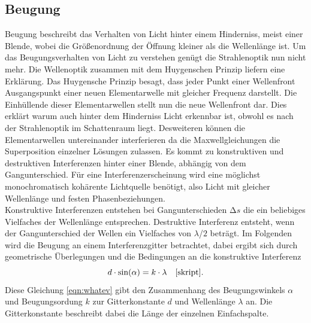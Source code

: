 \subsection{Beugung}
Beugung beschreibt das Verhalten von Licht hinter einem Hinderniss, meist einer Blende, wobei die Größenordnung der Öffnung kleiner als die Wellenlänge ist.
Um das Beugungsverhalten von Licht zu verstehen genügt die Strahlenoptik nun nicht mehr. Die Wellenoptik zusammen mit dem Huygenschen Prinzip liefern eine Erklärung. Das Huygensche Prinzip besagt, dass jeder Punkt einer Wellenfront
Ausgangspunkt einer neuen Elementarwelle mit gleicher Frequenz darstellt. Die Einhüllende dieser Elementarwellen stellt nun die neue Wellenfront dar. Dies erklärt warum auch hinter dem Hinderniss Licht erkennbar ist, obwohl es 
nach der Strahlenoptik im Schattenraum liegt. Desweiteren können die Elementarwellen untereinander interferieren da die Maxwellgleichungen die Superposition einzelner Lösungen zulassen. Es kommt zu konstruktiven und destruktiven
Interferenzen hinter einer Blende, abhängig von dem Gangunterschied. Für eine Interferenzerscheinung wird eine möglichst monochromatisch kohärente Lichtquelle benötigt, also Licht mit gleicher Wellenlänge und festen Phasenbeziehungen.
\\
Konstruktive Interferenzen entstehen bei Gangunterschieden $\increment s$ die ein beliebiges Vielfaches der Wellenlänge entsprechen. Destruktive Interferenz entsteht, wenn der Gangunterschied der Wellen ein Vielfaches von $\lambda$/$2$ beträgt.
Im Folgenden wird die Beugung an einem Interferenzgitter betrachtet, dabei ergibt sich durch geometrische Überlegungen und die Bedingungen an die konstruktive Interferenz
\begin{equation}
    \label{eqn:whatev}
d \cdot \text{sin}(\alpha) = k \cdot \lambda \quad \text{\cite{skript}}.
\end{equation}
Diese Gleichung \eqref{eqn:whatev} gibt den Zusammenhang des Beugungswinkels $\alpha$ und Beugungsordung $k$ zur Gitterkonstante $d$ und Wellenlänge $\lambda$ an. Die Gitterkonstante beschreibt dabei die Länge der einzelnen Einfachspalte.
